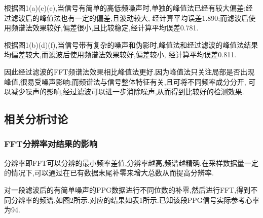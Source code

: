 \documentclass[12pt, a4paper, oneside]{ctexart}
\begin{document}
      根据图1(a)(c)(e),当信号有简单的高低频噪声时,单独的峰值法已经有较大偏差;经过滤波后的峰值法也有一定的偏差,且波动较大,
      经计算平均误差1.890;而滤波后使用频谱法效果较好,偏差很小,且比较稳定,经计算平均误差0.781.

      根据图1(b)(d)(f),当信号带有复杂的噪声和伪影时,峰值法和经过滤波的峰值法结果均偏差较大,而滤波后使用频谱法效果较好,偏差较小,
      经计算平均误差0.811.

      因此经过滤波的FFT频谱法效果相比峰值法更好.因为峰值法只关注局部是否出现峰值,很易受噪声影响;而频谱法与信号整体特征有关,且可将不同频率成分分开,
      可以减少噪声的影响,经过滤波可以进一步消除噪声,从而得到比较好的检测效果.
      \subsection{相关分析讨论}
      \subsubsection{FFT分辨率对结果的影响}
      分辨率即FFT可以分辨的最小频率差值,分辨率越高,频谱越精确.在采样数据量一定的情况下,可以通过在已有数据末尾补零来增大总数从而提高分辨率.

      对一段滤波后的有简单噪声的PPG数据进行不同位数的补零,然后进行FFT,得到不同分辨率的频谱,如图2所示.对应的结果如表1所示.已知该段PPG信号实际参考心率为94.
\end{document}

